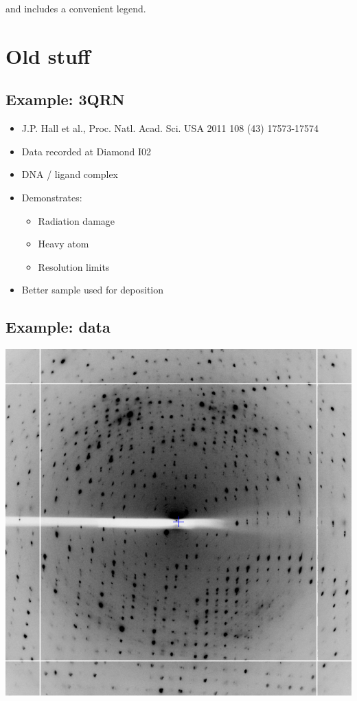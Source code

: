 \documentclass[a4paper, 11pt]{article}
\begin{document}
and includes a convenient legend.




















\section{Old stuff}

\subsection{Example: 3QRN}
\begin{itemize}
\item{J.P. Hall et al., Proc. Natl. Acad. Sci. USA 2011 108 (43) 17573-17574}
\item{Data recorded at Diamond I02}
\item{DNA / ligand complex}
\item{Demonstrates:
\begin{itemize}
\item{Radiation damage}
\item{Heavy atom}
\item{Resolution limits}
\end{itemize}
}
\item{Better sample used for deposition}
\end{itemize}



\subsection{Example: data}
\begin{center}
\includegraphics[scale=0.35]{figures/3qrn-diffraction.png}
\end{center}
\end{document}
